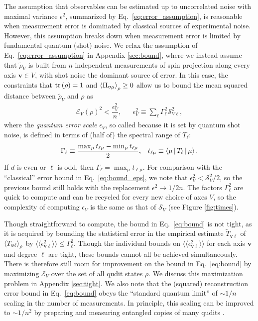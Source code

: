 \documentclass[notitlepage,twocolumn]{revtex4-2}
\newcommand{\f}[2]{\dfrac{#1}{#2}} %
\newcommand{\p}[1]{\left(#1\right)} %
\newcommand{\bk}{\Braket} %
\renewcommand{\v}{\bm} %
\newcommand{\bbk}[1]{\langle\!\langle #1 \rangle\!\rangle}
\newcommand{\E}{\mathcal{E}}
\renewcommand{\S}{\mathcal{S}}
\begin{document}
The assumption that observables can be estimated up to uncorrelated noise with maximal variance $\epsilon^2$, summarized by Eq.~\eqref{eq:error_assumption}, is reasonable when measurement error is dominated by classical sources of experimental noise.
However, this assumption breaks down when measurement error is limited by fundamental quantum (shot) noise.
We relax the assumption of Eq.~\eqref{eq:error_assumption} in Appendix \ref{sec:bound}, where we instead assume that $\tilde\rho_V$ is built from $n$ independent measurements of spin projection along every axis $\v v\in V$, with shot noise the dominant source of error.
In this case, the constraints that $\tr\p\rho=1$ and $\bk{\Pi_{\v v\mu}}_\rho\ge0$ allow us to bound the mean squared distance between $\tilde\rho_V$ and $\rho$ as
\begin{align}
  \E_V\p{\rho}^2 < \f{\epsilon_V^2}{n},
  &&
  \epsilon_V^2 \equiv \sum_\ell \Gamma_\ell^2 \S_{V\ell}^2,
  \label{eq:bound}
\end{align}
where the {\it quantum error scale} $\epsilon_V$, so called because it is set by quantum shot noise, is defined in terms of (half of) the spectral range of $T_\ell$:
\begin{align}
  \Gamma_\ell \equiv \f{\max_\mu t_{\ell\mu} - \min_\mu t_{\ell\mu}}{2},
  &&
  t_{\ell\mu} \equiv \bk{\mu|T_\ell|\mu}.
\end{align}
If $d$ is even or $\ell$ is odd, then $\Gamma_\ell=\max_\mu t_{\ell\mu}$.
For comparison with the ``classical'' error bound in Eq.~\eqref{eq:bound_eps}, we note that $\epsilon_V^2<\S_V^2/2$, so the previous bound still holds with the replacement $\epsilon^2\to1/2n$.
The factors $\Gamma_\ell^2$ are quick to compute and can be recycled for every new choice of axes $V$, so the complexity of computing $\epsilon_V$ is the same as that of $\S_V$ (see Figure \ref{fig:times}).

Though straightforward to compute, the bound in Eq.~\eqref{eq:bound} is not tight, as it is acquired by bounding the statistical error in the empirical estimate $\tilde T_{\v v\ell}$ of $\bk{T_{\v v\ell}}_\rho$ by $\bbk{\epsilon_{\v v\ell}^2}\le\Gamma_\ell^2$.
Though the individual bounds on $\bbk{\epsilon_{\v v\ell}^2}$ for each axis $\v v$ and degree $\ell$ are tight, these bounds cannot all be achieved simultaneously.
There is therefore still room for improvement on the bound in Eq.~\eqref{eq:bound} by maximizing $\E_V$ over the set of all qudit states $\rho$.
We discuss this maximization problem in Appendix \ref{sec:tight}.
We also note that the (squared) reconstruction error bound in Eq.~\eqref{eq:bound} obeys the ``standard quantum limit'' of $\sim1/n$ scaling in the number of measurements.
In principle, this scaling can be improved to $\sim1/n^2$ by preparing and measuring entangled copies of many qudits \cite{giovannetti2006quantum}.
\end{document}
